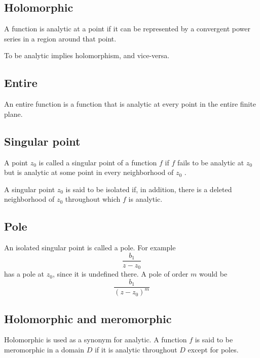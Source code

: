 \documentclass[11pt, oneside]{article}
\begin{document}
\subsection*{Holomorphic}
A function is analytic at a point if it can be represented by a convergent power series in a region around that point.

To be analytic implies holomorphism, and vice-versa.

\subsection*{Entire}
An entire function is a function that is analytic at every point in the entire finite plane.

\subsection*{Singular point}
A point $z_0$ is called a singular point of a function $f$ if $f$ fails to be analytic at $z_0$  but is analytic at some point in every neighborhood of $z_0$ . 

A singular point $z_0$  is said to be isolated if, in addition, there is a deleted neighborhood  of $z_0$  throughout which $f$ is analytic.

\subsection*{Pole}
An isolated singular point is called a pole.  For example
\[ \frac{b_1}{z - z_0} \]
has a pole at $z_0$, since it is undefined there.  A pole of order $m$ would be
\[ \frac{b_1}{(z - z_0)^m} \]

\subsection*{Holomorphic and meromorphic}
Holomorphic is used as a synonym for analytic.  A function $f$ is said to be meromorphic in a domain $D$ if it is analytic throughout $D$ except for poles.
\end{document}
